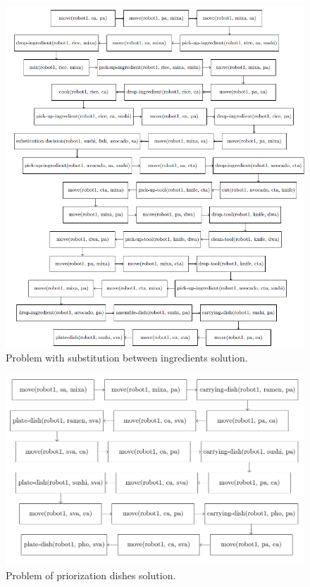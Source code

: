   \begin{figure}[t]
    \centering
    \includegraphics[width=1\linewidth]{fig2.png}
    \caption{Problem with substitution between ingredients solution.}
    \label{fig:fig2}
  \end{figure}

  \begin{figure}[h]
    \centering
    \includegraphics[width=0.7\linewidth]{fig3.png}
    \caption{Problem of priorization dishes solution.}
    \label{fig:fig3}
  \end{figure}